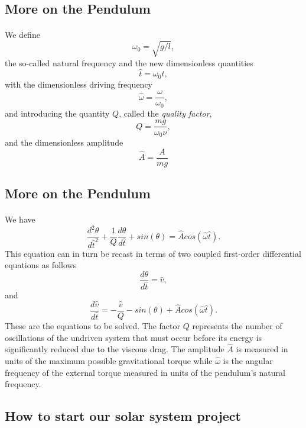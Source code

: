 \documentclass[%
oneside,                 %
final,                   %
10pt]{article}
\begin{document}
\subsection*{More on the Pendulum}

\paragraph{}
We define 
  \[
      \omega_0=\sqrt{g/l},
  \]
the so-called natural frequency and the new dimensionless quantities
  \[
      \hat{t}=\omega_0t,
  \]
with the dimensionless driving frequency
  \[
     \hat{\omega}=\frac{\omega}{\omega_0},
  \]
and introducing the quantity $Q$, called the \emph{quality factor},
  \[
     Q=\frac{mg}{\omega_0\nu},
  \]
  and the dimensionless amplitude 
\[
\hat{A}=\frac{A}{mg}
  \]



\subsection*{More on the Pendulum}

\paragraph{}
We have 
\[
    \frac{d^2\theta}{d\hat{t}^2}+\frac{1}{Q}\frac{d\theta}{d\hat{t}}  
     +sin(\theta)=\hat{A}cos(\hat{\omega}\hat{t}).
\]
This equation can in turn be recast in terms of two coupled first-order differential equations as follows
\[
     \frac{d\theta}{d\hat{t}}=\hat{v},
\]
and
\[
     \frac{d\hat{v}}{d\hat{t}}=-\frac{\hat{v}}{Q}-sin(\theta)+\hat{A}cos(\hat{\omega}\hat{t}).
\]
These are the equations to be solved.  The factor $Q$ represents the number of oscillations of the undriven system that must occur before  its energy is significantly reduced due to the viscous drag. The  amplitude $\hat{A}$ is measured in units of the maximum possible  gravitational torque while $\hat{\omega}$ is the angular frequency of the external torque measured in units of the pendulum's natural frequency.




\subsection*{How to start our solar system project}
\end{document}
